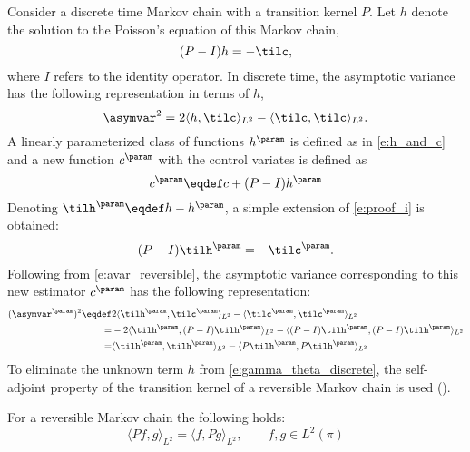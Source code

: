 Consider a discrete time Markov chain with a transition kernel $P$.  Let $h$ denote the solution to the Poisson's equation of this Markov chain,
\[
(P - I) h = -\tilc,
\]
where $I$ refers to the identity operator.
In discrete time, the asymptotic variance has the following representation in terms of $h$,
\begin{equation}
\asymvar^2 = 2 \langle h, \tilc \rangle_{L^2} - \langle \tilc, \tilc \rangle_{L^2}.
\label{e:avar_reversible}
\end{equation}
A linearly parameterized class of functions $h^\param$ is defined as in \eqref{e:h_and_c} and a new function $c^\param$ with the control variates is defined as
\[
c^\param \eqdef c +  (P - I) h^\param
\]
Denoting $\tilh^\param \eqdef h - h^\param$, a simple extension of \eqref{e:proof_i} is obtained:
\[
(P - I) \tilh^\param = -\tilc^\param.
\]
Following from \eqref{e:avar_reversible}, the asymptotic variance corresponding to this new estimator $c^\param$ has the following representation:
\begin{equation}
\begin{aligned}
(\asymvar^\param)^2 \eqdef & 2 \langle \tilh^\param, \tilc^\param \rangle_{L^2} - \langle \tilc^\param, \tilc^\param \rangle_{L^2}\\
= &  - 2 \langle \tilh^\param, (P - I) \tilh^\param \rangle_{L^2} -\langle (P - I) \tilh^\param, (P - I) \tilh^\param \rangle_{L^2}\\
= & \langle \tilh^\param, \tilh^\param \rangle_{L^2} - \langle P \tilh^\param, P \tilh^\param \rangle_{L^2}
\label{e:gamma_theta_discrete}
\end{aligned}
\end{equation}
To eliminate the unknown term $h$ from \eqref{e:gamma_theta_discrete}, the self-adjoint property of the transition kernel of a reversible Markov chain is used ().
\begin{proposition}
	\label{t:self_adjoint}
	For a reversible Markov chain the following holds:
	\[
	\langle P f , g \rangle_{L^2}= \langle f, P g \rangle_{L^2}, \qquad f,g \in L^2(\pi)
	\]
\end{proposition}
